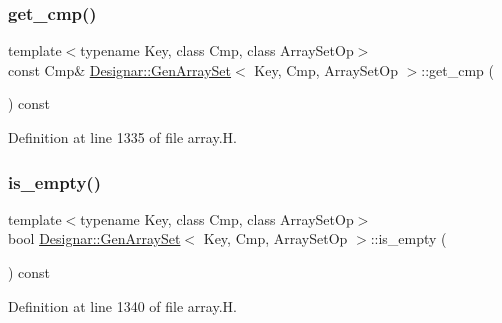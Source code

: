 \subsubsection{\texorpdfstring{get\+\_\+cmp()}{get\_cmp()}\hspace{0.1cm}{\footnotesize\ttfamily [2/2]}}
{\footnotesize\ttfamily template$<$typename Key, class Cmp, class Array\+Set\+Op$>$ \\
const Cmp\& \hyperlink{class_designar_1_1_gen_array_set}{Designar\+::\+Gen\+Array\+Set}$<$ Key, Cmp, Array\+Set\+Op $>$\+::get\+\_\+cmp (\begin{DoxyParamCaption}{ }\end{DoxyParamCaption}) const\hspace{0.3cm}{\ttfamily [inline]}}



Definition at line 1335 of file array.\+H.

\mbox{\label{class_designar_1_1_gen_array_set_aca8ce9f7cb1ded74fd8067a535817836}} 
\subsubsection{\texorpdfstring{is\+\_\+empty()}{is\_empty()}}
{\footnotesize\ttfamily template$<$typename Key, class Cmp, class Array\+Set\+Op$>$ \\
bool \hyperlink{class_designar_1_1_gen_array_set}{Designar\+::\+Gen\+Array\+Set}$<$ Key, Cmp, Array\+Set\+Op $>$\+::is\+\_\+empty (\begin{DoxyParamCaption}{ }\end{DoxyParamCaption}) const\hspace{0.3cm}{\ttfamily [inline]}}



Definition at line 1340 of file array.\+H.

\mbox{\label{class_designar_1_1_gen_array_set_a048871f9ab15af3c26cfda4dbb47d272}} 
